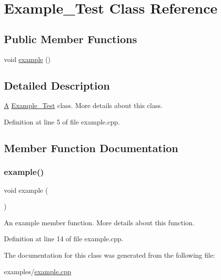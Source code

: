 \hypertarget{class_example___test}{}\section{Example\+\_\+\+Test Class Reference}
\label{class_example___test}
\subsection*{Public Member Functions}
\begin{DoxyCompactItemize}
\item 
void \hyperlink{class_example___test_afa2b50f4716fc3b42221a72e676e1422}{example} ()
\end{DoxyCompactItemize}


\subsection{Detailed Description}
\hyperlink{class_a}{A} \hyperlink{class_example___test}{Example\+\_\+\+Test} class. More details about this class. 

Definition at line 5 of file example.\+cpp.



\subsection{Member Function Documentation}
\mbox{\label{class_example___test_afa2b50f4716fc3b42221a72e676e1422}} 
\subsubsection{\texorpdfstring{example()}{example()}}
{\footnotesize\ttfamily void example (\begin{DoxyParamCaption}{ }\end{DoxyParamCaption})}

An example member function. More details about this function. 

Definition at line 14 of file example.\+cpp.



The documentation for this class was generated from the following file\+:\begin{DoxyCompactItemize}
\item 
examples/\hyperlink{example_8cpp}{example.\+cpp}\end{DoxyCompactItemize}
